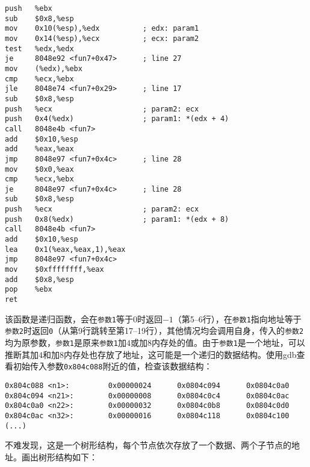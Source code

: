 \documentclass[a4paper, 11pt]{ctexart}
\begin{document}
\begin{verbatim}
push   %ebx
sub    $0x8,%esp
mov    0x10(%esp),%edx          ; edx: param1
mov    0x14(%esp),%ecx          ; ecx: param2
test   %edx,%edx
je     8048e92 <fun7+0x47>      ; line 27
mov    (%edx),%ebx
cmp    %ecx,%ebx
jle    8048e74 <fun7+0x29>      ; line 17
sub    $0x8,%esp
push   %ecx                     ; param2: ecx
push   0x4(%edx)                ; param1: *(edx + 4)
call   8048e4b <fun7>
add    $0x10,%esp
add    %eax,%eax
jmp    8048e97 <fun7+0x4c>      ; line 28
mov    $0x0,%eax
cmp    %ecx,%ebx
je     8048e97 <fun7+0x4c>      ; line 28
sub    $0x8,%esp
push   %ecx                     ; param2: ecx
push   0x8(%edx)                ; param1: *(edx + 8)
call   8048e4b <fun7>
add    $0x10,%esp
lea    0x1(%eax,%eax,1),%eax
jmp    8048e97 <fun7+0x4c>
mov    $0xffffffff,%eax
add    $0x8,%esp
pop    %ebx
ret
\end{verbatim}

该函数是递归函数，会在\texttt{参数1}等于$0$时返回$-1$（第5--6行），在\texttt{参数1}指向地址等于\texttt{参数2}时返回\texttt{0}（从第9行跳转至第17--19行），其他情况均会调用自身，传入的\texttt{参数2}均为原参数，\texttt{参数1}是原来\texttt{参数1}加$4$或加$8$内存处的值。由于\texttt{参数1}是一个地址，可以推断其加$4$和加$8$内存处也存放了地址，这可能是一个递归的数据结构。使用gdb查看初始传入参数\texttt{0x804c088}附近的值，检查该数据结构：

\begin{verbatim}
0x804c088 <n1>:         0x00000024      0x0804c094      0x0804c0a0
0x804c094 <n21>:        0x00000008      0x0804c0c4      0x0804c0ac
0x804c0a0 <n22>:        0x00000032      0x0804c0b8      0x0804c0d0
0x804c0ac <n32>:        0x00000016      0x0804c118      0x0804c100
(...)
\end{verbatim}

不难发现，这是一个树形结构，每个节点依次存放了一个数据、两个子节点的地址。画出树形结构如下：

\begin{center}
\end{center}
\end{document}
